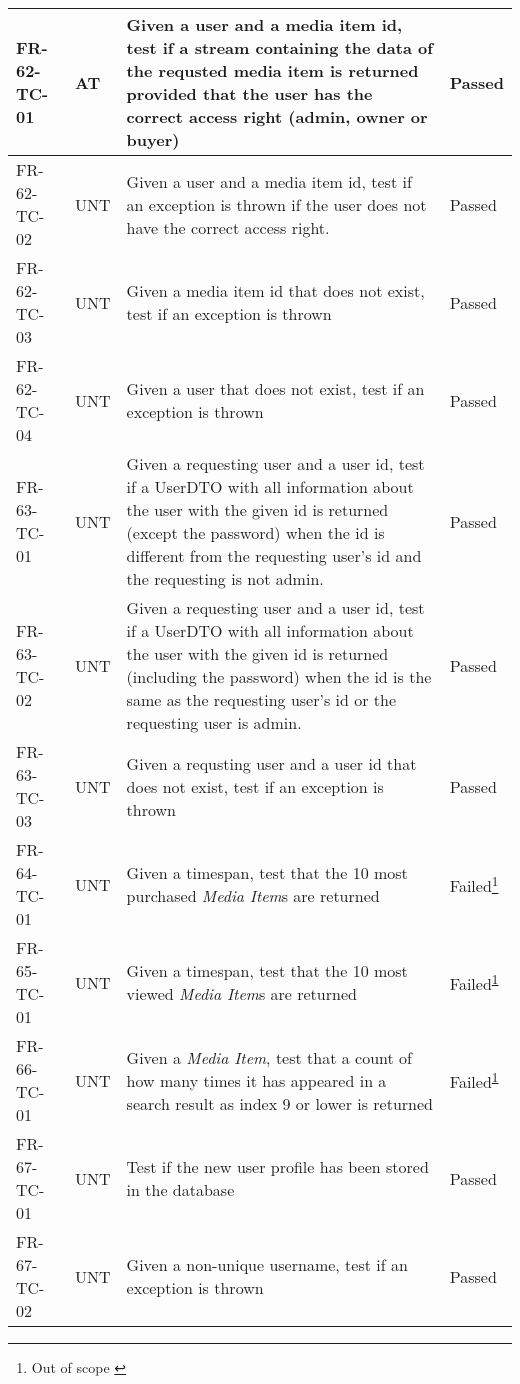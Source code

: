 \documentclass[../report.tex]{subfiles}
\newcommand{\footnoteref}[1]{\textsuperscript{\ref{#1}}}
\begin{document}
\begin{longtable}{|L{2.1cm}|L{1cm}|L{12.4cm}|L{1.4cm}|}
FR-62-TC-01&AT&Given a user and a media item id, test if a stream containing the data of the requsted media item is returned provided that the user has the correct access right (admin, owner or buyer)&Passed  \\ \hline
FR-62-TC-02&UNT&Given a user and a media item id, test if an exception is thrown if the user does not have the correct access right.&Passed  \\ \hline
FR-62-TC-03&UNT&Given a media item id that does not exist, test if an exception is thrown&Passed  \\ \hline
FR-62-TC-04&UNT&Given a user that does not exist, test if an exception is thrown&Passed  \\ \hline
FR-63-TC-01&UNT&Given a requesting user and a user id, test if a UserDTO with all information about the user with the given id is returned (except the password) when the id is different from the requesting user's id and the requesting is not admin.&Passed  \\ \hline
FR-63-TC-02&UNT&Given a requesting user and a user id, test if a UserDTO with all information about the user with the given id is returned (including the password) when the id is the same as the requesting user's id or the requesting user is admin.&Passed  \\ \hline
FR-63-TC-03&UNT&Given a requsting user and a user id that does not exist, test if an exception is thrown&Passed  \\ \hline
FR-64-TC-01 & UNT & Given a timespan, test that the 10 most purchased \textit{Media Item}s are returned & Failed\footnote{Out of scope \label{note2}}  \\ \hline
FR-65-TC-01 & UNT & Given a timespan, test that the 10 most viewed \textit{Media Item}s are returned & Failed\footnoteref{note2}  \\ \hline
FR-66-TC-01 & UNT & Given a \textit{Media Item}, test that a count of how many times it has appeared in a search result as index 9 or lower is returned & Failed\footnoteref{note2}  \\ \hline
FR-67-TC-01&UNT&Test if the new user profile has been stored in the database&Passed  \\ \hline
FR-67-TC-02&UNT&Given a non-unique username, test if an exception is thrown&Passed  \\ \hline

\end{longtable}
\end{document}
